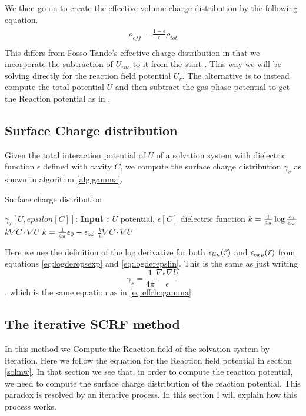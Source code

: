 \documentclass[../master_thesis.tex]{subfiles}
\begin{document}
We then go on to create the effective volume charge distribution by the following equation.
\begin{align}
    \begin{split}
      \rho_{eff} = \frac{1 - \epsilon}{\epsilon}\rho_{tot}\\
    \end{split}
\end{align}
This differs from Fosso-Tande's effective charge distribution in that we incorporate
the subtraction of $U_{vac}$ to it from the start \cite{FossoTande:2013ka}. This
way we will be solving directly for the reaction field potential $U_r$.
The alternative is to instead compute the total potential $U$ and then subtract
the gas phase potential to get the Reaction potential as in \cite{FossoTande:2013ka}.

\subsection{Surface Charge distribution}
Given the total interaction potential of $U$ of a solvation system with
dielectric function $\epsilon$ defined with cavity $C$, we compute the surface charge distribution
$\gamma_s$ as shown in algorithm \ref{alg:gamma}.
\begin{algorithm}
  \caption{Surface charge distribution}\label{alg:gamma}
  \begin{algorithmic}
    \STATE $\gamma_s[U, epsilon[C]]$:
    \STATE \textbf{Input :} $U$ potential, $\epsilon[C]$ dielectric function
      \STATE $k = \frac{1}{4\pi}\log\frac{\epsilon_{0}}{\epsilon_{\infty}}$
      \RETURN $k \nabla C \cdot \nabla U$
      \STATE $k = \frac{1}{4\pi}\epsilon_{0}-\epsilon_{\infty}$
      \RETURN $\frac{k}{\epsilon} \nabla C \cdot \nabla U$
    \ENDIF
  \end{algorithmic}
\end{algorithm}

Here we use the definition of the log derivative for both $\epsilon_{lin}(\vec{r})$ and $\epsilon_{exp}(\vec{r})$
from equations \ref{eq:logderepsexp} and \ref{eq:logderepslin}. This is the same
as just writing $$\gamma_s = \frac{1}{4\pi}\frac{\nabla\epsilon\nabla U}{\epsilon}$$,
which is the same equation as in \ref{eq:effrhogamma}.

\subsection{The iterative \ac{SCRF} method}
In this method we Compute the Reaction field of the solvation system by iteration.
Here we follow the equation for the Reaction field potential in section \ref{solmw}.
In that section we see that, in order to compute the reaction potential, we need
to compute the surface charge distribution of the reaction potential. This
paradox is resolved by an iterative process. In this section I will explain how
this process works.
\end{document}
